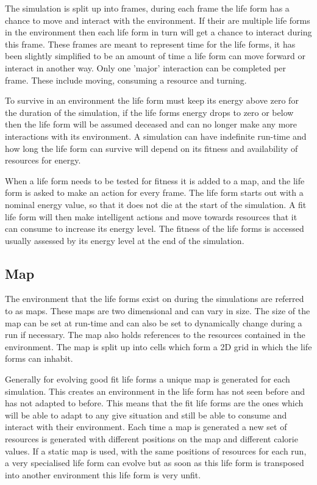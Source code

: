 \documentclass[12pt]{article}
\begin{document}
The simulation is split up into frames, during each frame the life form has a chance to move and interact with the environment. If their
are multiple life forms in the environment then each life form in turn will get a chance to interact during this frame. These frames are
meant to represent time for the life forms, it has been slightly simplified to be an amount of time a life form can move forward or interact in another way. Only one 'major' interaction can be completed per frame. These include moving, consuming a resource and turning.

To survive in an environment the life form must keep its energy above zero for the duration of the simulation, if the life forms energy
drops to zero or below then the life form will be assumed deceased and can no longer make any more interactions with its environment. A simulation can have indefinite run-time and how long the life form can survive will depend on its fitness and availability of resources for energy.

When a life form needs to be tested for fitness it is added to a map, and the life form is asked to make an action for every frame. The life form starts out
with a nominal energy value, so that it does not die at the start of the simulation. A fit life form will then make intelligent actions and move towards resources
that it can consume to increase its energy level. The fitness of the life forms is accessed usually assessed by its energy level at the end of the simulation. 


\subsection{Map}

The environment that the life forms exist on during the simulations are referred to as maps. These maps are two dimensional and can vary in size.
The size of the map can be set at run-time and can also be set to dynamically change during a run if necessary. The map also holds references
to the resources contained in the environment. The map is split up into cells which form a 2D grid in which the life forms can inhabit. 

Generally for evolving good fit life forms a unique map is generated for each simulation. This creates an environment in the life form has not
seen before and has not adapted to before. This means that the fit life forms are the ones which will be able to adapt to any give situation
and still be able to consume and interact with their environment. Each time a map is generated a new set of resources is generated with different
positions on the map and different calorie values. If a static map is used, with the same positions of resources for each run, a very specialised 
life form can evolve but as soon as this life form is transposed into another environment this life form is very unfit.
\end{document}
